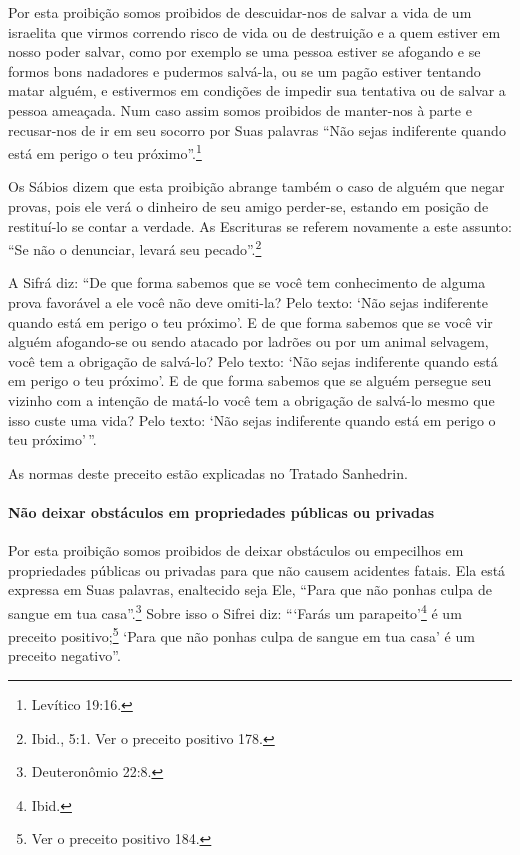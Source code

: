 Por esta proibição somos proibidos de descuidar-nos de salvar a vida de
um israelita que virmos correndo risco de vida ou de destruição e a quem
estiver em nosso poder salvar, como por exemplo se uma pessoa estiver se
afogando e se formos bons nadadores e pudermos salvá-la, ou se um pagão
estiver tentando matar alguém, e estivermos em condições de impedir sua
tentativa ou de salvar a pessoa ameaçada. Num caso assim somos proibidos
de manter-nos à parte e recusar-nos de ir em seu socorro por Suas
palavras ``Não sejas indiferente quando está em perigo o teu próximo''.\footnote{Levítico 19:16.}

Os Sábios dizem que esta proibição abrange também o caso de alguém que
negar provas, pois ele verá o dinheiro de seu amigo perder-se, estando
em posição de restituí-lo se contar a verdade. As Escrituras se referem
novamente a este assunto: ``Se não o denunciar, levará seu pecado''.\footnote{Ibid., 5:1. Ver o preceito positivo 178.}

A Sifrá diz: ``De que forma sabemos que se você tem conhecimento de
alguma prova favorável a ele você não deve omiti-la? Pelo texto: `Não
sejas indiferente quando está em perigo o teu próximo'. E de que forma
sabemos que se você vir alguém afogando-se ou sendo atacado por ladrões
ou por um animal selvagem, você tem a obrigação de salvá-lo? Pelo texto:
`Não sejas indiferente quando está em perigo o teu próximo'. E de que
forma sabemos que se alguém persegue seu vizinho com a intenção de
matá-lo você tem a obrigação de salvá-lo mesmo que isso custe uma vida?
Pelo texto: `Não sejas indiferente quando está em perigo o teu
próximo'\,''.

As normas deste preceito estão explicadas no Tratado Sanhedrin.

\paragraph{Não deixar obstáculos em propriedades públicas ou privadas}

Por esta proibição somos proibidos de deixar obstáculos ou empecilhos
em propriedades públicas ou privadas para que não causem acidentes
fatais. Ela está expressa em Suas palavras, enaltecido seja Ele, ``Para
que não ponhas culpa de sangue em tua casa''.\footnote{Deuteronômio 22:8.} Sobre
isso o Sifrei diz: ```Farás um parapeito'\footnote{Ibid.} é um preceito
positivo;\footnote{Ver o preceito positivo 184.} `Para que não ponhas culpa de sangue em
tua casa' é um preceito negativo''.

